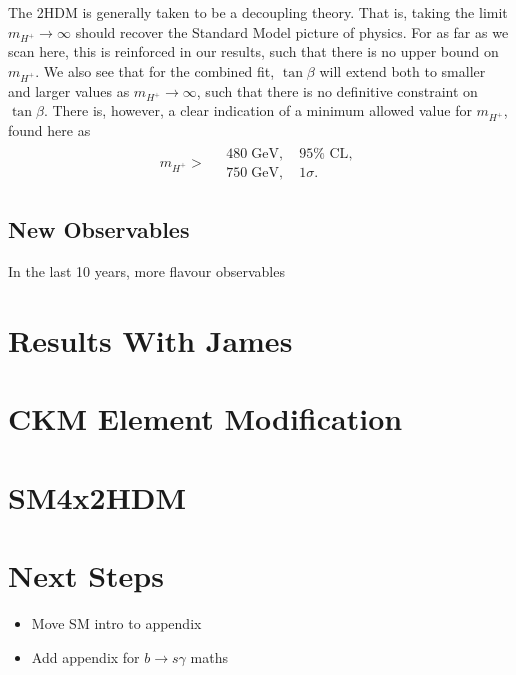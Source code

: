 \documentclass[a4paper,12pt]{article}
\begin{document}
The 2HDM is generally taken to be a decoupling theory. 
That is, taking the limit $m_{H^+} \to \infty$ should recover the Standard Model picture of physics.
For as far as we scan here, this is reinforced in our results, such that there is no upper bound on $m_{H^+}$. 
We also see that for the combined fit, $\tan\beta$ will extend both to smaller and larger values as $m_{H^+}\to\infty$, such that there is no definitive constraint on $\tan\beta$. 
There is, however, a clear indication of a minimum allowed value for $m_{H^+}$, found here as
\begin{align}
    \label{eq:const}
    m_{H^+} >
    \begin{split}
         &\; 480 \;\text{GeV},\quad 95\% \text{ CL},\\
         &\; 750 \;\text{GeV},\quad 1\sigma.
    \end{split}
\end{align}

\subsection{New Observables}
\label{sec:rdbmu}
In the last 10 years, more flavour observables 

\section{Results With James}

\section{CKM Element Modification}

\section{SM4x2HDM}

\section{Next Steps}
\begin{itemize}
    \item Move SM intro to appendix
    \item Add appendix for $b\to s\gamma$ maths
\end{itemize}
\end{document}

